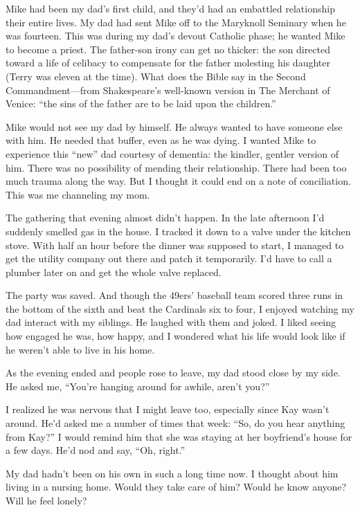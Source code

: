 \documentclass[12pt]{book}
\begin{document}
Mike had been my dad's first child, and they'd had an embattled relationship their entire lives. My dad had sent Mike off to the Maryknoll Seminary when he was fourteen. This was during my dad's devout Catholic phase; he wanted Mike to become a priest. The father-son irony can get no thicker: the son directed toward a life of celibacy to compensate for the father molesting his daughter (Terry was eleven at the time). What does the Bible say in the Second Commandment---from Shakespeare's well-known version in The Merchant of Venice: ``the sins of the father are to be laid upon the children.''

Mike would not see my dad by himself. He always wanted to have someone else with him. He needed that buffer, even as he was dying. I wanted Mike to experience this ``new'' dad courtesy of dementia: the kindler, gentler version of him. There was no possibility of mending their relationship. There had been too much trauma along the way. But I thought it could end on a note of conciliation. This was me channeling my mom.

The gathering that evening almost didn't happen. In the late afternoon I'd suddenly smelled gas in the house. I tracked it down to a valve under the kitchen stove. With half an hour before the dinner was supposed to start, I managed to get the utility company out there and patch it temporarily. I'd have to call a plumber later on and get the whole valve replaced.

The party was saved. And though the 49ers' baseball team scored three runs in the bottom of the sixth and beat the Cardinals six to four, I enjoyed watching my dad interact with my siblings. He laughed with them and joked. I liked seeing how engaged he was, how happy, and I wondered what his life would look like if he weren't able to live in his home.

As the evening ended and people rose to leave, my dad stood close by my side. He asked me, ``You're hanging around for awhile, aren't you?''

I realized he was nervous that I might leave too, especially since Kay wasn't around. He'd asked me a number of times that week: ``So, do you hear anything from Kay?'' I would remind him that she was staying at her boyfriend's house for a few days. He'd nod and say, ``Oh, right.''

My dad hadn't been on his own in such a long time now. I thought about him living in a nursing home. Would they take care of him? Would he know anyone? Will he feel lonely?
\end{document}

